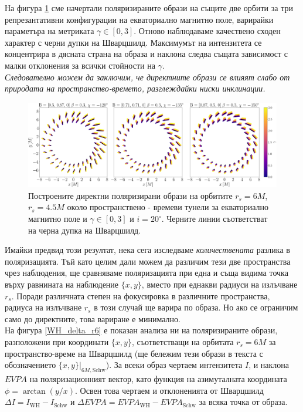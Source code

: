 На фигура \ref{WH_pol_eq_field} сме начертали поляризираните образи на същите две орбити за три репрезантативни конфигурации на екваториално магнитно поле, варирайки параметъра на метриката $\gamma \in[0,3]$. Отново наблюдаваме качествено сходен характер с черни дупки на Шварцшилд. Максимумът на интензитета се концентрира в дясната страна на образа и наклона следва същата зависимост с малки отклонения за всички стойности на $\gamma$. \\

\emph{Следователно можем да заключим, че директните образи се влияят слабо от природата на пространство-времето, разглеждайки ниски инклинации.}

\begin{figure}[!htb]
	\centering
	\includegraphics[scale = 0.2]{WH_alpha_Eq_Field.png}
	\caption[Поляризирани директни образи около пространствено - времеви тунели за екваториално магнитно поле.]{\small Построените директни поляризирани образи на орбитите $r_s = 6M$, $r_s = 4.5M$ около пространствено - времеви тунели за екваториално магнитно поле и $\gamma \in[0,3]$ и $i = 20^\circ$. Черните линии съответстват на черна дупка на Шварцшилд.} 
	\label{WH_pol_eq_field}
\end{figure}

\newpage

Имайки предвид този резултат, нека сега изследваме \emph{количествената} разлика в поляризацията. Тъй като целим дали можем да различим тези две пространства чрез наблюдения, ще сравняваме поляризацията при една и съща видима точка върху равнината на наблюдение $\{x,y\}$, вместо при еднакви радиуси на излъчване $r_s$. Поради различната степен на фокусировка в различните пространства, радиуса на излъчване $r_s$ в този случай ще варира по образа. Но ако се ограничим само до директните, това вариране е минимално.\\

На фигура \ref{WH_delta_r6} е показан анализа ни на поляризираните образи, разположени при координати $\{x,y\}$, съответстващи на орбитата $r_s = 6M$ за пространство-време на Шварцшилд (ще бележим тези образи в текста с обозначението $\{x,y\}\vert_{6M, \text{Schw}}$). За всеки образ чертаем интензитета $I$, и наклона $EVPA$ на поляризационният вектор, като функция на азимуталната координата $\phi = \arctan(y / x)$. Освен това чертаем и отклоненията от Шварцшилд $\Delta I = I_{\text{WH}} - I_{\text{Schw}}$ и $\Delta EVPA = EVPA_\text{WH} - EVPA_\text{Schw}$ за всяка точка от образа.

